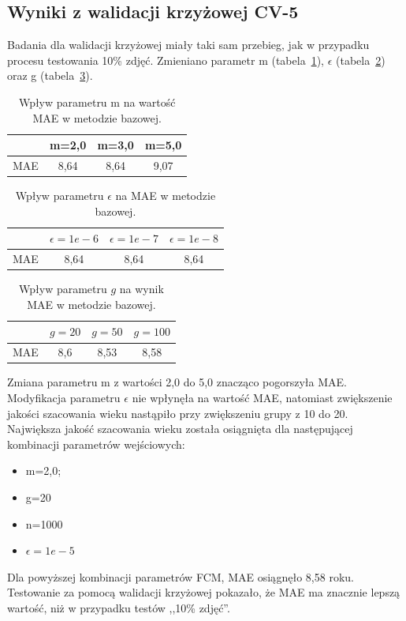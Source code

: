 \documentclass[a4paper,twoside,12pt]{book}
\begin{document}
    \subsection*{Wyniki z walidacji krzyżowej CV-5}
    Badania dla walidacji krzyżowej miały taki sam przebieg, jak w przypadku procesu testowania 10\% zdjęć.
    Zmieniano parametr m (tabela~\ref{tab.bazowa_m_cv}), $\epsilon$ (tabela~\ref{tab.bazowa_e_cv})
    oraz g (tabela~\ref{tab.bazowa_g_cv}).
    \begin{table}[h!]
        \centering
        \caption{Wpływ parametru m na wartość MAE w metodzie bazowej.}
        \begin{tabular}{|c|c|c|c|}
            \hline
            & m=2,0 & m=3,0 & m=5,0 \\ \hline
            MAE & 8,64 & 8,64 & 9,07 \\ \hline
        \end{tabular}
        \label{tab.bazowa_m_cv}
    \end{table}
    \begin{table}[h!]
        \centering
        \caption{Wpływ parametru $\epsilon$ na MAE w metodzie bazowej.}
        \begin{tabular}{|c|c|c|c|}
            \hline
            & $\epsilon=1e-6$ & $\epsilon=1e-7$ & $\epsilon=1e-8$ \\ \hline
            MAE & 8,64 & 8,64 & 8,64 \\ \hline
        \end{tabular}
        \label{tab.bazowa_e_cv}
    \end{table}
    \begin{table}[h!]
        \centering
        \caption{Wpływ parametru $g$ na wynik MAE w metodzie bazowej.}
        \begin{tabular}{|c|c|c|c|}
            \hline
            & $g=20$ & $g=50$ & $g=100$ \\ \hline
            MAE & 8,6 & 8,53 & 8,58 \\ \hline
        \end{tabular}
        \label{tab.bazowa_g_cv}
    \end{table}
    Zmiana parametru m z wartości 2,0 do 5,0 znacząco pogorszyła MAE. Modyfikacja parametru $\epsilon$ nie wpłynęła
    na wartość MAE, natomiast zwiększenie jakości szacowania wieku nastąpiło przy zwiększeniu grupy z 10 do 20.
    Największa jakość szacowania wieku została osiągnięta dla następującej kombinacji parametrów wejściowych:
    \begin{itemize}
        \item m=2,0;
        \item g=20
        \item n=1000
        \item $\epsilon=1e-5$
    \end{itemize}
    Dla powyższej kombinacji parametrów FCM, MAE osiągnęło 8,58 roku.
    Testowanie za pomocą walidacji krzyżowej pokazało, że MAE ma znacznie lepszą wartość, niż w przypadku testów ,,10\%
    zdjęć''.
\end{document}
